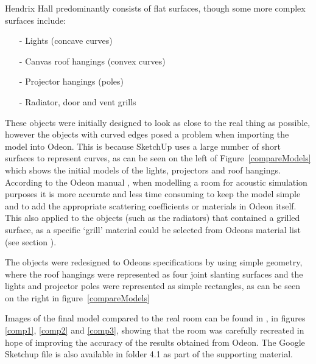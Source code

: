 \documentclass[../../main.tex]{subfiles}
\begin{document}
			Hendrix Hall predominantly consists of flat surfaces, though some more complex surfaces include:

			\begin{itemize}
				\item[-] Lights (concave curves) 
				\item[-] Canvas roof hangings (convex curves) 
				\item[-] Projector hangings (poles)
				\item[-] Radiator, door and vent grills \\
			\end{itemize}

			These objects were initially designed to look as close to the real thing as possible, however the objects with curved edges posed a problem when importing the model into Odeon. This is because SketchUp uses a large number of short surfaces to represent curves, as can be seen on the left of Figure~\ref{compareModels} which shows the initial models of the lights, projectors and roof hangings. According to the Odeon manual \cite{odeonManual}, when modelling a room for acoustic simulation purposes it is more accurate and less time consuming to keep the model simple and to add the appropriate scattering coefficients or materials in Odeon itself. This also applied to the objects (such as the radiators) that contained a grilled surface, as a specific `grill' material could be selected from Odeons material list (see section ).

			The objects were redesigned to Odeons specifications by using simple geometry, where the roof hangings were represented as four joint slanting surfaces and the lights and projector poles were represented as simple rectangles, as can be seen on the right in figure~\ref{compareModels}

			Images of the final model compared to the real room can be found in , in figures \ref{comp1}, \ref{comp2} and \ref{comp3}, showing that the room was carefully recreated in hope of improving the accuracy of the results obtained from Odeon. The Google Sketchup file is also available in folder 4.1 as part of the supporting material.
\end{document}
